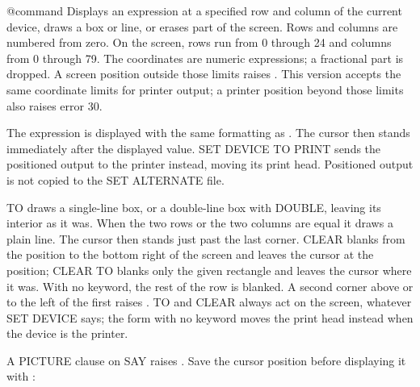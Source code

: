 \begin{XbaseEntry}{@}{command}
Displays an expression at a specified row and column of the current device,
draws a box or line, or erases part of the screen.
\Syntax
{}
\Usage
Rows and columns are numbered from zero.  On the screen, rows run from 0
through 24 and columns from 0 through 79.  The coordinates are numeric
expressions; a fractional part is dropped.  A screen position outside those
limits raises .
This version accepts the same coordinate limits for printer output; a
printer position beyond those limits also raises error 30.

The expression is displayed with the same formatting as .  The cursor
then stands immediately after the displayed value.  SET DEVICE TO PRINT
sends the positioned output to the printer instead, moving its print head.
Positioned output is not copied to the SET ALTERNATE file.

TO draws a single-line box, or a double-line box with DOUBLE, leaving its
interior as it was.  When the two rows or the two columns are equal it draws a
plain line.  The cursor then stands just past the last corner.  CLEAR blanks
from the position to the bottom right of the screen and leaves the cursor at
the position; CLEAR TO blanks only the given rectangle and leaves the cursor
where it was.  With no keyword, the rest of the row is blanked.  A second corner
above or to the left of the first raises .  TO and CLEAR
always act on the screen, whatever SET DEVICE says; the form with no keyword
moves the print head instead when the device is the printer.

A PICTURE clause on SAY raises
.
\Examples
Save the cursor position before displaying it with :
\end{XbaseEntry}
